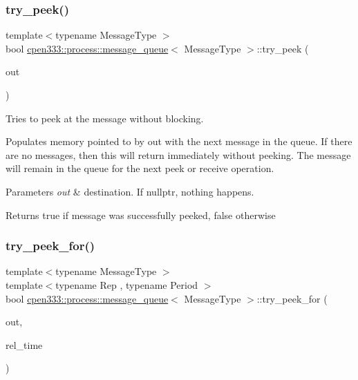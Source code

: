 \subsubsection{\texorpdfstring{try\+\_\+peek()}{try\_peek()}}
{\footnotesize\ttfamily template$<$typename Message\+Type $>$ \\
bool \hyperlink{classcpen333_1_1process_1_1message__queue}{cpen333\+::process\+::message\+\_\+queue}$<$ Message\+Type $>$\+::try\+\_\+peek (\begin{DoxyParamCaption}\item[{Message\+Type $\ast$}]{out }\end{DoxyParamCaption})\hspace{0.3cm}{\ttfamily [inline]}}



Tries to peek at the message without blocking. 

Populates memory pointed to by {\ttfamily out} with the next message in the queue. If there are no messages, then this will return immediately without peeking. The message will remain in the queue for the next {\ttfamily peek} or {\ttfamily receive} operation.


\begin{DoxyParams}{Parameters}
{\em out} & destination. If {\ttfamily nullptr}, nothing happens. \\
\hline
\end{DoxyParams}
\begin{DoxyReturn}{Returns}
{\ttfamily true} if message was successfully peeked, {\ttfamily false} otherwise 
\end{DoxyReturn}
\mbox{\label{classcpen333_1_1process_1_1message__queue_a62077115caee87a6eccd527924015748}} 
\subsubsection{\texorpdfstring{try\+\_\+peek\+\_\+for()}{try\_peek\_for()}}
{\footnotesize\ttfamily template$<$typename Message\+Type $>$ \\
template$<$typename Rep , typename Period $>$ \\
bool \hyperlink{classcpen333_1_1process_1_1message__queue}{cpen333\+::process\+::message\+\_\+queue}$<$ Message\+Type $>$\+::try\+\_\+peek\+\_\+for (\begin{DoxyParamCaption}\item[{Message\+Type $\ast$}]{out,  }\item[{std\+::chrono\+::duration$<$ Rep, Period $>$ \&}]{rel\+\_\+time }\end{DoxyParamCaption})\hspace{0.3cm}{\ttfamily [inline]}}



